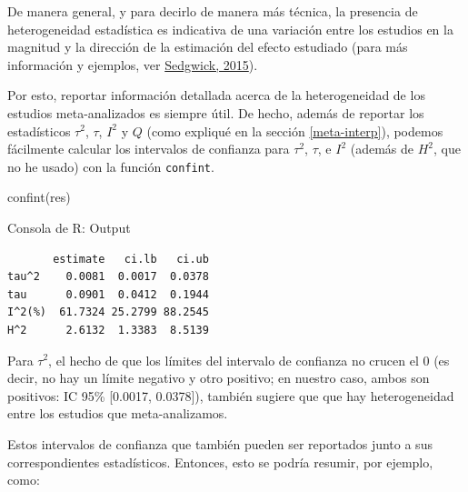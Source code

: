 \documentclass[
  bookmarksnumbered]{article}
\newenvironment{Shaded}{\begin{snugshade}}{\end{snugshade}}
\newcommand{\FunctionTok}[1]{\textcolor[rgb]{0.39,0.29,0.61}{#1}}
\newcommand{\NormalTok}[1]{\textcolor[rgb]{0.12,0.11,0.11}{#1}}
\begin{document}
De manera general, y para decirlo de manera más técnica, la presencia de heterogeneidad estadística es indicativa de una variación entre los estudios en la magnitud y la dirección de la estimación del efecto estudiado (para más información y ejemplos, ver \protect\hyperlink{ref-sedgwickMetaanalysesWhatHeterogeneity2015}{Sedgwick, 2015}).

Por esto, reportar información detallada acerca de la heterogeneidad de los estudios meta-analizados es siempre útil. De hecho, además de reportar los estadísticos \(\tau^2\), \(\tau\), \(I^2\) y \(Q\) (como expliqué en la sección \ref{meta-interp}), podemos fácilmente calcular los intervalos de confianza para \(\tau^2\), \(\tau\), e \(I^2\) (además de \(H^2\), que no he usado) con la función \texttt{confint}.

\begin{Shaded}
\begin{Highlighting}[]
\FunctionTok{confint}\NormalTok{(res)}
\end{Highlighting}
\end{Shaded}

\begin{ROut}{Consola de R: Output~\thetcbcounter}
                \begin{footnotesize}
                \begin{verbatim} 
       estimate   ci.lb   ci.ub 
tau^2    0.0081  0.0017  0.0378 
tau      0.0901  0.0412  0.1944 
I^2(%)  61.7324 25.2799 88.2545 
H^2      2.6132  1.3383  8.5139 
 \end{verbatim}
                \end{footnotesize}
                \end{ROut}

Para \(\tau^2\), el hecho de que los límites del intervalo de confianza no crucen el 0 (es decir, no hay un límite negativo y otro positivo; en nuestro caso, ambos son positivos: IC 95\% {[}0.0017, 0.0378{]}), también sugiere que que hay heterogeneidad entre los estudios que meta-analizamos.

Estos intervalos de confianza que también pueden ser reportados junto a sus correspondientes estadísticos. Entonces, esto se podría resumir, por ejemplo, como:
\end{document}

